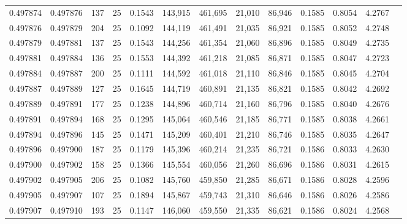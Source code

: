 \begin{tabular}{rrrrrrrrrrrrr}
0.497874 & 0.497876 & 137 &  25 &                                     0.1543 & 143,915 & 461,695 &  21,010 &  86,946 & 0.1585 & 0.8054 & 4.2767 \\
0.497876 & 0.497879 & 204 &  25 &                                     0.1092 & 144,119 & 461,491 &  21,035 &  86,921 & 0.1585 & 0.8052 & 4.2748 \\
0.497879 & 0.497881 & 137 &  25 &                                     0.1543 & 144,256 & 461,354 &  21,060 &  86,896 & 0.1585 & 0.8049 & 4.2735 \\
0.497881 & 0.497884 & 136 &  25 &                                     0.1553 & 144,392 & 461,218 &  21,085 &  86,871 & 0.1585 & 0.8047 & 4.2723 \\
0.497884 & 0.497887 & 200 &  25 &                                     0.1111 & 144,592 & 461,018 &  21,110 &  86,846 & 0.1585 & 0.8045 & 4.2704 \\
0.497887 & 0.497889 & 127 &  25 &                                     0.1645 & 144,719 & 460,891 &  21,135 &  86,821 & 0.1585 & 0.8042 & 4.2692 \\
0.497889 & 0.497891 & 177 &  25 &                                     0.1238 & 144,896 & 460,714 &  21,160 &  86,796 & 0.1585 & 0.8040 & 4.2676 \\
0.497891 & 0.497894 & 168 &  25 &                                     0.1295 & 145,064 & 460,546 &  21,185 &  86,771 & 0.1585 & 0.8038 & 4.2661 \\
0.497894 & 0.497896 & 145 &  25 &                                     0.1471 & 145,209 & 460,401 &  21,210 &  86,746 & 0.1585 & 0.8035 & 4.2647 \\
0.497896 & 0.497900 & 187 &  25 &                                     0.1179 & 145,396 & 460,214 &  21,235 &  86,721 & 0.1586 & 0.8033 & 4.2630 \\
0.497900 & 0.497902 & 158 &  25 &                                     0.1366 & 145,554 & 460,056 &  21,260 &  86,696 & 0.1586 & 0.8031 & 4.2615 \\
0.497902 & 0.497905 & 206 &  25 &                                     0.1082 & 145,760 & 459,850 &  21,285 &  86,671 & 0.1586 & 0.8028 & 4.2596 \\
0.497905 & 0.497907 & 107 &  25 &                                     0.1894 & 145,867 & 459,743 &  21,310 &  86,646 & 0.1586 & 0.8026 & 4.2586 \\
0.497907 & 0.497910 & 193 &  25 &                                     0.1147 & 146,060 & 459,550 &  21,335 &  86,621 & 0.1586 & 0.8024 & 4.2568 \\

\end{tabular}

